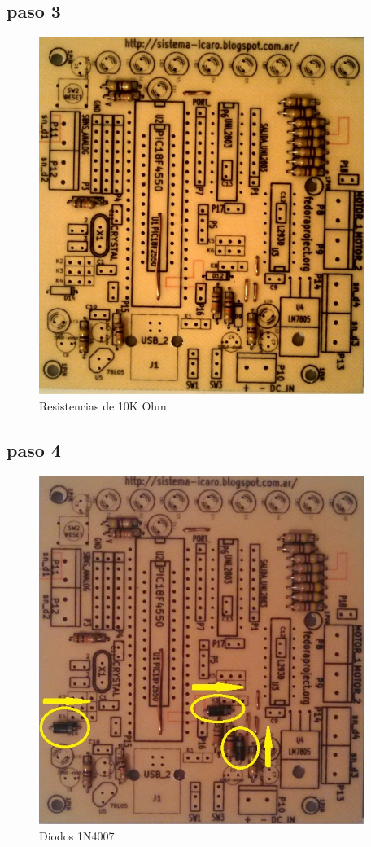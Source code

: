 \documentclass[letterpaper,10pt,english]{sphinxmanual}
\begin{document}
\subsection{paso 3}
\label{np07:paso-3}\begin{figure}[htbp]
\centering
\capstart

\includegraphics[width=300pt]{3b.jpg}
\caption{Resistencias de 10K Ohm}\end{figure}
\newpage

\subsection{paso 4}
\label{np07:paso-4}\begin{figure}[htbp]
\centering
\capstart

\includegraphics[width=300pt]{4b.jpg}
\caption{Diodos 1N4007}\end{figure}
\newpage
\end{document}
